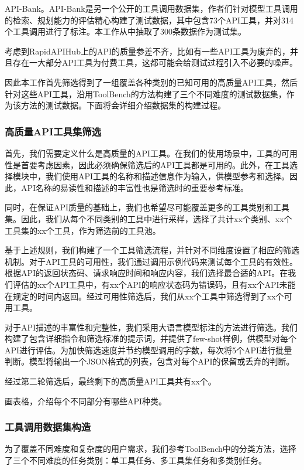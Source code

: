 API-Bank。API-Bank\cite{Li2023}是另一个公开的工具调用数据集，作者们针对模型工具调用的检索、规划能力的评估精心构建了测试数据，其中包含73个API工具，并对314个工具调用进行了标注。本工作从中抽取了300条数据作为测试集。

考虑到RapidAPIHub上的API的质量参差不齐，比如有一些API工具为废弃的，并且存在一大部分API工具为付费工具，这都可能会给测试过程引入不必要的噪声。

因此本工作首先筛选得到了一组覆盖各种类别的已知可用的高质量API工具，然后针对这些API工具，沿用ToolBench的方法构建了三个不同难度的测试数据集，作为该方法的测试数据。下面将会详细介绍数据集的构建过程。


\subsubsection{高质量API工具集筛选}

首先，我们需要定义什么是高质量的API工具。在我们的使用场景中，工具的可用性是首要考虑因素，因此必须确保筛选后的API工具都是可用的。此外，在工具选择模块中，我们使用API工具的名称和描述信息作为输入，供模型参考和选择。因此，API名称的易读性和描述的丰富性也是筛选时的重要参考标准。

同时，在保证API质量的基础上，我们也希望尽可能覆盖更多的工具类别和工具集。因此，我们从每个不同类别的工具中进行采样，选择了共计xx个类别、xx个工具集的xx个工具，作为筛选前的工具池。

基于上述规则，我们构建了一个工具筛选流程，并针对不同维度设置了相应的筛选机制。对于API工具的可用性，我们通过调用示例代码来测试每个工具的有效性。根据API的返回状态码、请求响应时间和响应内容，我们选择最合适的API。在我们评估的xx个API工具中，有xx个API的响应状态码为错误码，且有xx个API未能在规定的时间内返回。经过可用性筛选后，我们从xx个工具中筛选得到了xx个可用工具。

对于API描述的丰富性和完整性，我们采用大语言模型标注的方法进行筛选。我们构建了包含详细指令和筛选标准的提示词，并提供了few-shot样例，供模型对每个API进行评估。为加快筛选速度并节约模型调用的字数，每次将5个API进行批量判断。模型将输出一个JSON格式的列表，包含对每个API的保留或丢弃的判断。

经过第二轮筛选后，最终剩下的高质量API工具共有xx个。

画表格，介绍每个不同部分有哪些API种类。

\subsubsection{工具调用数据集构造}

为了覆盖不同难度和复杂度的用户需求，我们参考ToolBench中的分类方法，选择了三个不同难度的任务类别：单工具任务、多工具集任务和多类别任务。

